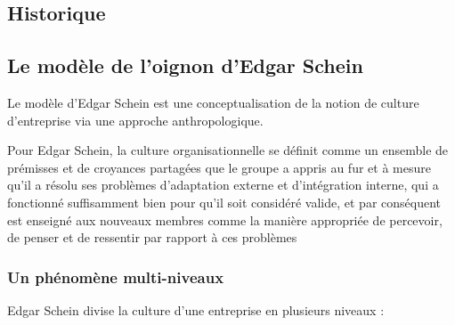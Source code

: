 \documentclass[12pt]{article}
\begin{document}
	\subsection{Historique}
	\subsection{Le modèle de l'oignon d'Edgar Schein}
	
	Le modèle d'Edgar Schein est une conceptualisation de la notion de culture d'entreprise via une approche anthropologique.
	
	Pour Edgar Schein, la culture organisationnelle se définit comme \og{} un ensemble de prémisses et de croyances partagées que le groupe a appris au fur et à mesure qu'il a résolu ses problèmes d'adaptation externe et d'intégration interne, qui a fonctionné suffisamment bien pour qu'il soit considéré valide, et par conséquent est enseigné aux nouveaux membres comme la manière appropriée de percevoir, de penser et de ressentir par rapport à ces problèmes \fg{} \cite{schein2010}
	
	  \subsubsection{Un phénomène multi-niveaux}
	  
	  Edgar Schein divise la culture d'une entreprise en plusieurs niveaux :
	  
\end{document}
